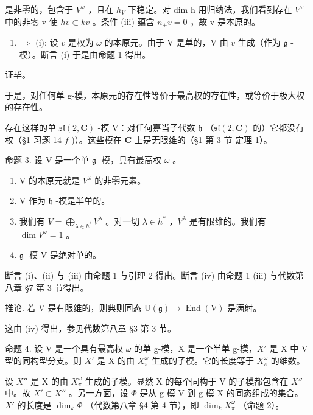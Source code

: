 是非零的，包含于 \(V^{\omega}\) ，且在 \(h_{V}\) 下稳定。对 dim h 用归纳法，我们看到存在 \(V^{\omega}\) 中的非零 v 使 \(h v \subset kv\) 。条件 (iii) 蕴含 \(n_{+}v = 0\) ，故 v 是本原的。

\begin{enumerate}
\def\labelenumi{(\roman{enumi})}
\setcounter{enumi}{3}
\tightlist
\item
  \(\Longrightarrow\) (i): 设 \(v\) 是权为 \(\omega\) 的本原元。由于 V 是单的，V 由 \(v\) 生成（作为 \(\mathfrak{g}\) -模）。断言 (i) 于是由命题 1 得出。
\end{enumerate}

证毕。

于是，对任何单 g-模，本原元的存在性等价于最高权的存在性，或等价于极大权的存在性。

存在这样的单 \(\mathfrak{sl}(2,\mathbf{C})\) -模 V：对任何嘉当子代数 \(\mathfrak{h}\) （\(\mathfrak{sl}(2,\mathbf{C})\) 的）它都没有权（§1 习题 14 \(f\) )）。这些模在 \(\mathbf{C}\) 上是无限维的（§1 第 3 节 定理 1）。

命题 3. 设 V 是一个单 \(\mathfrak{g}\) -模，具有最高权 \(\omega\) 。

\begin{enumerate}
\def\labelenumi{(\roman{enumi})}
\item
  V 的本原元就是 \(V^{\omega}\) 的非零元素。
\item
  V 作为 \(\mathfrak{h}\) -模是半单的。
\item
  我们有 \(V = \bigoplus_{\lambda \in h^{*}} V^{\lambda}\) 。对一切 \(\lambda \in h^{*}\) ，\(V^{\lambda}\) 是有限维的。我们有 \(\dim V^{\omega} = 1\) 。
\item
  \(\mathfrak{g}\) -模 V 是绝对单的。
\end{enumerate}

断言 (i)、(ii) 与 (iii) 由命题 1 与引理 2 得出。断言 (iv) 由命题 1 (iii) 与代数第八章 §7 第 3 节得出。

推论. 若 \(\mathrm{V}\) 是有限维的，则典则同态 \(\mathrm{U}(\mathfrak{g}) \to \operatorname{End}(\mathrm{V})\) 是满射。

这由 (iv) 得出，参见代数第八章 §3 第 3 节。

命题 4. 设 V 是一个具有最高权 \(\omega\) 的单 g-模，X 是一个半单 g-模，\(X'\) 是 X 中 V 型的同构型分支。则 \(X'\) 是 X 的由 \(X_{\pi}^{\omega}\) 生成的子模。它的长度等于 \(X_{\pi}^{\omega}\) 的维数。

设 \(X''\) 是 X 的由 \(X_{\pi}^{\omega}\) 生成的子模。显然 X 的每个同构于 V 的子模都包含在 \(X''\) 中。故 \(X' \subset X''\) 。另一方面，设 \(\varPhi\) 是从 g-模 V 到 g-模 X 的同态组成的集合。\(X'\) 的长度是 \(\dim_k \varPhi\) （代数第八章 §4 第 4 节），即 \(\dim_k X_{\pi}^{\omega}\) （命题 2）。

